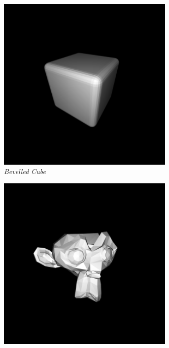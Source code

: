 \documentclass[crop=false]{standalone}
\begin{document}
      \begin{figure}[h]
        \center
        \begin{subfigure}[b]{0.30\textwidth}
          \center
          \includegraphics[width=0.95\textwidth]{images/bevelled_cube.png}
          \caption{%
            \textit{Bevelled Cube}
          }
        \end{subfigure}
        \begin{subfigure}[b]{0.30\textwidth}
          \center
          \includegraphics[width=0.95\textwidth]{images/asymmetric_suzanne.png}

\end{subfigure}
\end{figure}
\end{document}
